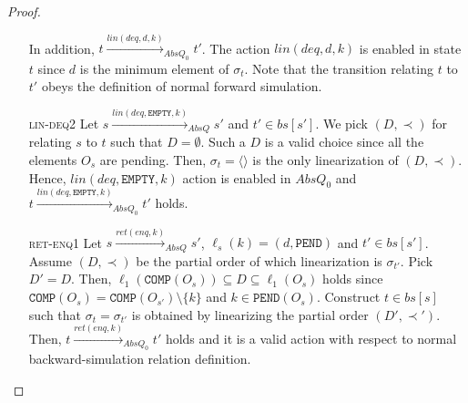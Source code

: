 \begin{proof}
\begin{itemize}
In addition, $t \xrightarrow{lin(deq,d,k)}_{AbsQ_0} t'$. The action $lin(deq,d,k)$ is enabled in state $t$ since $d$ is the minimum element of $\sigma_t$. Note that the transition relating $t$ to $t'$ obeys the definition of normal forward simulation.

\item[\textsc{lin-deq2}]  Let $s \xrightarrow{lin(deq,\texttt{EMPTY},k)}_{AbsQ} s'$ and $t' \in bs[s']$. We pick $(D, \prec)$ for relating $s$ to $t$ such that $D = \emptyset$. Such a $D$ is a valid choice since all the elements $O_s$ are pending. Then, $\sigma_t = \langle \rangle$ is the only linearization of $(D, \prec)$. Hence, $lin(deq,\texttt{EMPTY},k)$ action is enabled in $AbsQ_0$ and $t \xrightarrow{lin(deq,\texttt{EMPTY},k)}_{AbsQ_0} t'$ holds.

\item[\textsc{ret-enq1}]  Let $s \xrightarrow{ret(enq,k)}_{AbsQ} s'$, $\ell_s(k) = (d,\texttt{PEND})$ and $t' \in bs[s']$. Assume $(D, \prec)$ be the partial order of which linearization is $\sigma_{t'}$. Pick $D'=D$. Then, $\ell_1(\texttt{COMP}(O_s)) \subseteq D \subseteq \ell_1(O_s)$ holds since $\texttt{COMP}(O_s) = \texttt{COMP}(O_{s'}) \setminus \{k\}$ and $k \in \texttt{PEND}(O_s)$. Construct $t \in bs[s]$ such that $\sigma_t = \sigma_{t'}$ is obtained by linearizing the partial order $(D',\prec')$. Then, $t \xrightarrow{ret(enq,k)}_{AbsQ_0} t'$ holds and it is a valid action with respect to normal backward-simulation relation definition. 


\end{itemize}
\end{proof}
